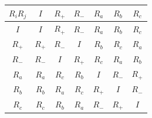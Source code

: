 \begin{center}\begin{tabular}{c|cccccc}
\toprule
$R_iR_j$&$I$&$R_+$&$R_-$&$R_a$&$R_b$&$R_c$\\\midrule
$I$&$I$&$R_+$&$R_-$&$R_a$&$R_b$&$R_c$\\
$R_+$&$R_+$&$R_-$&$I$&$R_b$&$R_c$&$R_a$\\
$R_-$&$R_-$&$I$&$R_+$&$R_c$&$R_a$&$R_b$\\
$R_a$&$R_a$&$R_c$&$R_b$&$I$&$R_-$&$R_+$\\
$R_b$&$R_b$&$R_a$&$R_c$&$R_+$&$I$&$R_-$\\
$R_c$&$R_c$&$R_b$&$R_a$&$R_-$&$R_+$&$I$\\
\bottomrule\end{tabular}\end{center}
